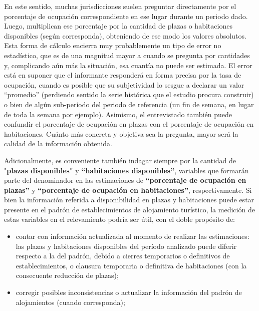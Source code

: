 \documentclass[
]{book}
\begin{document}
En este sentido, muchas jurisdicciones suelen preguntar directamente por el porcentaje de ocupación correspondiente en ese lugar durante un periodo dado. Luego, multiplican ese porcentaje por la cantidad de plazas o habitaciones disponibles (según corresponda), obteniendo de ese modo los valores absolutos. Esta forma de cálculo encierra muy probablemente un tipo de error no estadístico, que es de una magnitud mayor a cuando se pregunta por cantidades y, complicando aún más la situación, esa cuantía no puede ser estimada. El error está en suponer que el informante responderá en forma precisa por la tasa de ocupación, cuando es posible que su subjetividad lo sesgue a declarar un valor ``promedio'' (perdiendo sentido la serie histórica que el estudio procura construir) o bien de algún sub-período del periodo de referencia (un fin de semana, en lugar de toda la semana por ejemplo). Asimismo, el entrevistado también puede confundir el porcentaje de ocupación en plazas con el porcentaje de ocupación en habitaciones. Cuánto más concreta y objetiva sea la pregunta, mayor será la calidad de la información obtenida.

Adicionalmente, es conveniente también indagar siempre por la cantidad de "\textbf{plazas disponibles"} y \textbf{``habitaciones disponibles''}, variables que formarán parte del denominador en las estimaciones de \textbf{``porcentaje de ocupación en plazas''} y \textbf{``porcentaje de ocupación en habitaciones''}, respectivamente. Si bien la información referida a disponibilidad en plazas y habitaciones puede estar presente en el padrón de establecimientos de alojamiento turístico, la medición de estas variables en el relevamiento podría ser útil, con el doble propósito de:

\begin{itemize}
\item
  contar con información actualizada al momento de realizar las estimaciones: las plazas y habitaciones disponibles del período analizado puede diferir respecto a la del padrón, debido a cierres temporarios o definitivos de establecimientos, o clausura temporaria o definitiva de habitaciones (con la consecuente reducción de plazas);
\item
  corregir posibles inconsistencias o actualizar la información del padrón de alojamientos (cuando corresponda);
\end{itemize}
\end{document}
